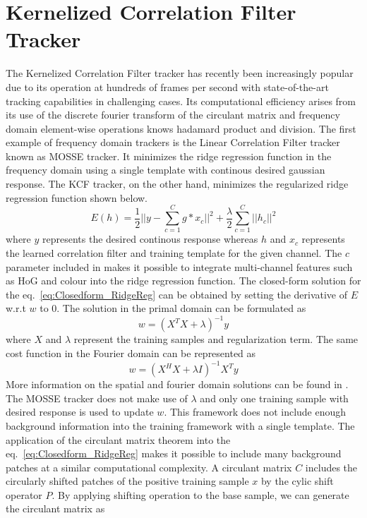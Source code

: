 \documentclass[10pt,twocolumn,letterpaper]{article}
\newcounter{ct}
\begin{document}
\section{Kernelized Correlation Filter Tracker}
\label{KCF}
The Kernelized Correlation Filter tracker has recently been increasingly popular due to its operation at hundreds of frames per second with state-of-the-art tracking capabilities in
challenging cases. Its computational efficiency arises from its use of the discrete fourier transform of the circulant matrix and frequency domain element-wise operations knows hadamard product and division. The first example of frequency domain trackers is the Linear Correlation Filter tracker known as MOSSE tracker. It minimizes the ridge regression function
in the frequency domain using a single template with continous desired gaussian response. The KCF tracker, on the other hand, minimizes the regularized ridge regression function shown below. 
\begin{equation}
E(h) = \frac{1}{2}||y-\sum_{c=1}^{C}g*x_{c}||^{2} + \frac{\lambda}{2}\sum_{c=1}^{C}||h_{c}||^{2}
\label{eq:Closedform_RidgeReg}
\end{equation}
where $y$ represents the desired continous response whereas $h$ and $x_{c}$ represents the learned correlation filter and training template for the given channel. The $c$ parameter included in \cite{henriques2015high,galoogahi2013multi} makes it possible to integrate multi-channel features such as HoG and colour into the ridge regression function. The closed-form solution for the eq.~\ref{eq:Closedform_RidgeReg} can be obtained by setting the derivative of $E$ w.r.t $w$ to $0$. The solution in the primal domain can be formulated as
\begin{equation}
w = (X^{T}X+\lambda)^{-1}y
\label{eq:SpatialSolution}
\end{equation}
where $X$ and $\lambda$ represent the training samples and regularization term. The same cost function in the Fourier domain can be represented as
\begin{equation}
w = (X^{H}X+\lambda I)^{-1}X^{T}y
\label{eq:FourierSolution}
\end{equation}
More information on the spatial and fourier domain solutions can be found in \cite{henriques2015high}. The MOSSE tracker does not make use of $\lambda$ and only one training sample with desired response is used to update $w$. This framework does not include enough background information into the training framework with a single template. The application of the circulant matrix theorem into the eq.~\ref{eq:Closedform_RidgeReg} makes it possible to include many background patches at a similar computational complexity. A circulant matrix $C$ includes the circularly shifted patches of the positive training sample $x$ by the cylic shift operator $P$. By applying shifting operation to the base sample, we can generate the circulant matrix as
\end{document}
